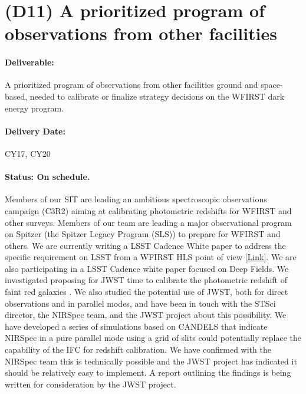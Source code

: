 \section*{(D11) A prioritized program of observations from other facilities}

\paragraph*{Deliverable:} A prioritized program of observations from other facilities
ground and space-based, needed to calibrate or finalize strategy decisions on
the WFIRST dark energy program.

\paragraph*{Delivery Date:} CY17, CY20

\paragraph*{Status: On schedule.} Members of our SIT are leading an ambitious spectroscopic observations campaign (C3R2) aiming at calibrating photometric redshifts
for WFIRST and other surveys. Members of our team are leading a major
observational program on Spitzer (the Spitzer Legacy Program (SLS)) to prepare for WFIRST and others. We are currently writing a LSST Cadence White paper to address the specific requirement on LSST from a WFIRST HLS point of view  \href{https://www.lsst.org/call-whitepaper-2018}{[Link]}. We are also participating in a LSST Cadence white paper focused on Deep Fields. We investigated proposing for JWST time to calibrate the photometric redshift of faint red galaxies \citep{Hemmati:2018}. We also studied the potential use of JWST, both for direct observations and in parallel modes, and have been in touch with the STSci director, the NIRSpec team,  and the JWST project about this possibility.  We have developed a series of simulations based on CANDELS that indicate NIRSpec in a pure parallel mode using a grid of slits could potentially replace the capability of the IFC for redshift calibration.  We have confirmed with the NIRSpec team this is technically possible and the JWST project has indicated it should be relatively easy to implement.  A report outlining the findings is being written for consideration by the JWST project.

